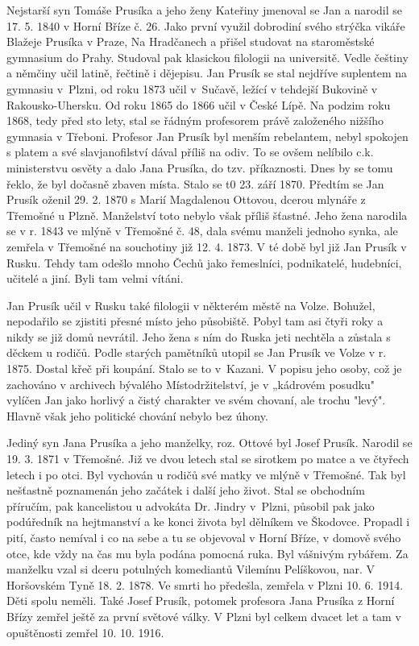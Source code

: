 \documentclass[../dejiny-rodu-prusiku.tex]{subfiles}
\begin{document}
Nejstarší syn Tomáše Prusíka a jeho ženy Kateřiny jmenoval se Jan a narodil se 17. 5. 1840 v Horní Bříze č. 26. Jako první využil dobrodiní svého strýčka vikáře Blažeje Prusíka v Praze, Na Hradčanech a přišel studovat na staroměstské gymnasium do Prahy. Studoval pak klasickou filologii na universitě. Vedle češtiny a němčiny učil latině, řečtině i dějepisu. Jan Prusík se stal nejdříve suplentem na gymnasiu v Plzni, od roku 1873 učil v Sučavě, ležící v tehdejší Bukovině v Rakousko-Uhersku. Od roku 1865 do 1866 učil v České Lípě. Na podzim roku 1868, tedy před sto lety, stal se řádným profesorem právě založeného nižšího gymnasia v Třeboni. Profesor Jan Prusík byl menším rebelantem, nebyl spokojen s platem a své slavjanofilství dával příliš na odiv. To se ovšem nelíbilo c.k. ministerstvu osvěty a dalo Jana Prusíka, do tzv. příkaznosti. Dnes by se tomu řeklo, že byl dočasně zbaven místa. Stalo se t0 23. září 1870. Předtím se Jan Prusík oženil 29. 2. 1870 s Marií Magda­lenou Ottovou, dcerou mlynáře z Třemošné u Plzně. Man­želství toto nebylo však příliš šťastné. Jeho žena narodila se v r. 1843 ve mlýně v Třemošné č. 48, dala svému manželi jednoho synka, ale zemřela v Třemošné na souchotiny již 12. 4. 1873. V té době byl již Jan Prusík v Rusku. Tehdy tam odešlo mnoho Čechů jako řemeslníci, podnikatelé, hudebníci, učitelé a jiní. Byli tam velmi vítáni.

Jan Prusík učil v Rusku také filologii v některém městě na Volze. Bohužel, nepodařilo se zjistiti přesné místo jeho působiště. Pobyl tam asi čtyři roky a nikdy se již domů nevrátil. Jeho žena s ním do Ruska jeti nechtěla a zůstala s děckem u rodičů. Podle starých pamětníků utopil se Jan Prusík ve Volze v r. 1875. Dostal křeč při koupání. Stalo se to v Kazani. V popisu jeho osoby, což je zachováno v archivech býva­lého Místodržitelství, je v „kádrovém posudku" vylíčen Jan jako horlivý a čistý charakter ve svém chovaní, ale trochu "levý". Hlavně však jeho politické chování nebylo bez úhony.

Jediný syn Jana Prusíka a jeho manželky, roz. Ottové byl Josef Prusík. Narodil se 19. 3. 1871 v Třemošné. Již ve dvou letech stal se sirotkem po matce a ve čtyřech letech i po otci. Byl vychován u rodičů své matky ve mlýně v Třemošné. Tak byl nešťastně poznamenán jeho za­čátek i další jeho život. Stal se obchodním příručím, pak kancelistou u advokáta Dr. Jindry v Plzni, působil pak jako podúředník na hejtmanství a ke konci života byl dělníkem ve Škodovce. Propadl i pití, často nemíval i co na sebe a tu se objevoval v Horní Bříze, v domově svého otce, kde vždy na čas mu byla podána pomocná ruka. Byl vášnivým rybářem. Za manželku vzal si dceru potulných komediantů Vilemínu Pelíškovou, nar. V Horšovském Tyně 18. 2. 1878. Ve smrti ho předešla, zemře­la v Plzni 10. 6. 1914. Děti spolu neměli. Také Josef Prusík, potomek profesora Jana Prusíka z Horní Břízy zemřel ještě za první světové války. V Plzni byl celkem dvacet let a tam v opuštěnosti zemřel 10. 10. 1916.
\end{document}
